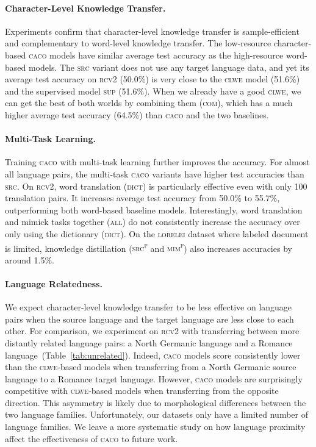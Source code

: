 \documentclass[letterpaper]{article} %
\newcommand{\abr}[1]{\textsc{#1}}
\newcommand{\name}[0]{\textsc{caco}}
\newcommand{\pp}[0]{\textsuperscript{p}}
\begin{document}
\paragraph{Character-Level Knowledge Transfer.}
Experiments confirm that character-level knowledge transfer is sample-efficient
and complementary to word-level knowledge transfer.
The low-resource character-based \name{} models have similar average test
accuracy as the high-resource word-based models.
The \abr{src} variant does not use any
target language data, and yet its average test accuracy on \abr{rcv2} (50.0\%)
is very close to the \abr{clwe} model (51.6\%) and the supervised model
\abr{sup} (51.6\%).
When we already have a good \abr{clwe}, we can get the best of both worlds by
combining them (\abr{com}), which has a much higher average test accuracy
(64.5\%) than \name{} and the two baselines.

\paragraph{Multi-Task Learning.}
Training \name{} with multi-task learning further improves the accuracy.  For
almost all language pairs, the multi-task \name{} variants have higher test
accuracies than \abr{src}.
On \abr{rcv2}, word translation (\abr{dict}) is particularly effective even
with only 100 translation pairs. 
It increases average test accuracy from 50.0\% to 55.7\%, outperforming both
word-based baseline models.
Interestingly, word translation and mimick tasks together (\abr{all}) do not
consistently increase the accuracy over only using the dictionary (\abr{dict}).
On the \abr{lorelei} dataset where labeled document is limited, knowledge
distillation (\abr{src\pp{}} and \abr{mim\pp{}}) also increases
accuracies by around 1.5\%.

\paragraph{Language Relatedness.}
We expect character-level knowledge transfer to be less effective on language
pairs when the source language and the target language are less close to each
other.
For comparison, we experiment on \abr{rcv2} with transferring between more
distantly related language pairs: a North Germanic language and a Romance
language~(Table~\ref{tab:unrelated}).
Indeed, \name{} models score consistently
lower than the \abr{clwe}-based models when transferring from a North Germanic
source language to a Romance target language.  However, \name{} models are
surprisingly competitive with \abr{clwe}-based models when transferring from
the opposite direction.  This asymmetry is likely due to morphological
differences between the two language families.
Unfortunately, our datasets only have a limited number of language families.
We leave a more systematic study on how language proximity affect the
effectiveness of \name{} to future work.
\end{document}

